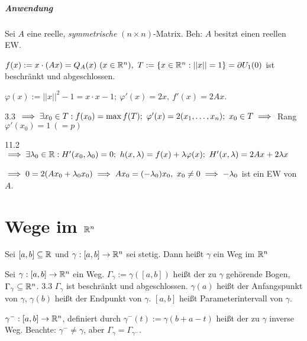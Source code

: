 \documentclass[a4paper,twoside,DIV15,BCOR12mm]{scrbook}
\begin{document}
\paragraph{Anwendung}
Sei $A$ eine reelle, \emph{symmetrische} $(n\times n)$-Matrix. Beh: $A$ besitzt einen reellen EW.

\begin{beweis}
$f(x) := x\cdot(Ax) = Q_A(x)\ (x \in \mathbb{R}^n),\ T:= \{x \in \mathbb{R}^n: ||x||=1\} = \partial U_1(0)$ ist beschränkt und abgeschlossen.

$\varphi(x) := ||x||^2-1 = x\cdot x-1;\ \varphi'(x) = 2x,\ f'(x) = 2Ax$.

3.3 $\implies \exists x_0 \in T: f(x_0) = \max f(T);\ \varphi'(x) = 2(x_1,\ldots,x_n);\ x_0 \in T \implies$ Rang $\varphi'(x_0) = 1\ (=p)$

11.2 $\folgt \exists \lambda_0 \in \MdR: H'(x_0,\lambda_0) = 0;\ h(x,\lambda) = f(x)+\lambda\varphi(x);\ H'(x,\lambda) = 2Ax+2\lambda x$

$\implies 0 = 2(Ax_0+\lambda_0 x_0) \implies Ax_0 = (-\lambda_0) x_0,\ x_0 \ne 0 \implies -\lambda_0$ ist ein EW von $A$.
\end{beweis}
\chapter{Wege im $\mathbb{R}^n$}
 
\begin{definition}
\begin{liste}
\item Sei $[a,b]\subseteq \mathbb{R}$ und $\gamma: [a,b] \to \mathbb{R}^n$ sei stetig. Dann heißt $\gamma$ ein Weg im $\mathbb{R}^n$
\item Sei $\gamma :[a,b] \to \mathbb{R}^n$ ein Weg. $\Gamma_\gamma := \gamma([a,b])$ heißt der zu $\gamma$ gehörende Bogen, $\Gamma_\gamma \subseteq \mathbb{R}^n$. 3.3 \folgt{} $\Gamma_\gamma$ ist beschränkt und abgeschlossen. $\gamma(a)$ heißt der Anfangspunkt von $\gamma$, $\gamma(b)$ heißt der Endpunkt von $\gamma$. $[a,b]$ heißt Parameterintervall von $\gamma$.
\item $\gamma^-:[a,b]\to \mathbb{R}^n$, definiert durch $\gamma^-(t):=\gamma(b+a-t)$ heißt der zu $\gamma$ inverse Weg. Beachte: $\gamma^- \ne \gamma$, aber $\Gamma_\gamma = \Gamma_{\gamma^-}$.
\end{liste}
\end{definition}
\end{document}
